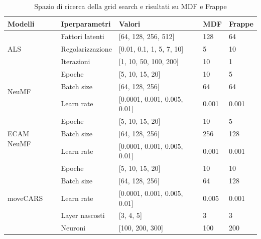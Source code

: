 \documentclass[12pt,italian]{report}
\begin{document}
\begin{table}[]
\centering
\begin{tabular}{@{}lllll@{}}
\toprule
\textbf{Modelli}                     & \textbf{Iperparametri}  & \textbf{Valori}       & \textbf{MDF} & \textbf{Frappe}                    \\ \midrule 
\multirow{3}{*}[-11pt]{ALS}        & Fattori latenti       & {[}64, 128, 256, 512{]} & 128 & 64          \\ \addlinespace[1em]
                            & Regolarizzazione & {[}0.01, 0.1, 1, 5, 7, 10{]}  & 5 & 10  \\  \addlinespace[1em]
                            & Iterazioni      & {[}1, 10, 50, 100, 200{]}   & 10  & 1   \\  \midrule 
                            
\multirow{3}{*}[-12pt]{NeuMF}      & Epoche         & {[}5, 10, 15, 20{]}  & 10 & 5           \\ \addlinespace[1em]
                            & Batch size     & {[}64, 128, 256{]}          & 64  & 64    \\ \addlinespace[1em]
                            & Learn rate     & {[}0.0001, 0.001, 0.005, 0.01{]} & 0.001 & 0.001 \\  \midrule 
                            
\multirow{3}{*}[-12pt]{ECAM NeuMF} & Epoche         & {[}5, 10, 15, 20{]}    & 10  & 5        \\ \addlinespace[1em]
                            & Batch size     & {[}64, 128, 256{]} & 256    & 128           \\ \addlinespace[1em]
                            & Learn rate     & {[}0.0001, 0.001, 0.005, 0.01{]} & 0.001 & 0.001\\   \midrule 
                            
\multirow{5}{*}[-24pt]{moveCARS}   & Epoche         & {[}5, 10, 15, 20{]} & 10  & 10             \\ \addlinespace[1em]
                            & Batch size     & {[}64, 128, 256{]} & 64 & 128        \\  \addlinespace[1em]
                            & Learn rate     & {[}0.0001, 0.001, 0.005, 0.01{]} & 0.005 & 0.001 \\    \addlinespace[1em]
                            & Layer nascosti        & {[}3, 4, 5{]} & 3 & 3                    \\ \addlinespace[1em]
                            & Neuroni        & {[}100, 200, 300{]} & 100 & 200\\           \midrule
\end{tabular}
\caption{\label{tab:grid-search}Spazio di ricerca della grid search e risultati su MDF e Frappe}
\end{table}
\end{document}
